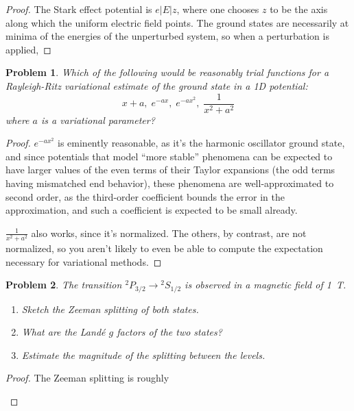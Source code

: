 \documentclass{article}
\newtheorem{plm}{Problem}
\begin{document}
\begin{proof}
  The Stark effect potential is $e|E|z$, where one chooses $z$ to be the axis along which the uniform electric field points.
  The ground states are necessarily at minima of the energies of the unperturbed system, so when a perturbation is applied,
\end{proof}

\begin{plm}
  Which of the following would be reasonably trial functions for a Rayleigh-Ritz variational estimate of the ground state in a 1D potential:
  \[
    x + a, \; e^{-ax}, \; e^{-ax^{2}}, \; \frac{1}{x^{2} + a^{2}}
  \]
  where $a$ is a variational parameter?
\end{plm}

\begin{proof}
  $e^{-ax^{2}}$ is eminently reasonable, as it's the harmonic oscillator ground state,
  and since potentials that model ``more stable'' phenomena can be expected to have larger values of the even terms of their Taylor expansions
  (the odd terms having mismatched end behavior), these phenomena are well-approximated to second order,
  as the third-order coefficient bounds the error in the approximation, and such a coefficient is expected to be small already.

  $\frac{1}{x^{2} + a^{2}}$ also works, since it's normalized.
  The others, by contrast, are not normalized, so you aren't likely to even be able to compute the expectation necessary for variational methods.
\end{proof}

\begin{plm}
  The transition ${}^{2}P_{3/2} \to {}^{2}S_{1/2}$ is observed in a magnetic field of \SI{1}{T}.
  \begin{enumerate}
  \item Sketch the Zeeman splitting of both states.
  \item What are the Land\'e $g$ factors of the two states?
  \item Estimate the magnitude of the splitting between the levels.
  \end{enumerate}
\end{plm}

\begin{proof}
  The Zeeman splitting is roughly
  \begin{center}
  \end{center}
\end{proof}
\end{document}

